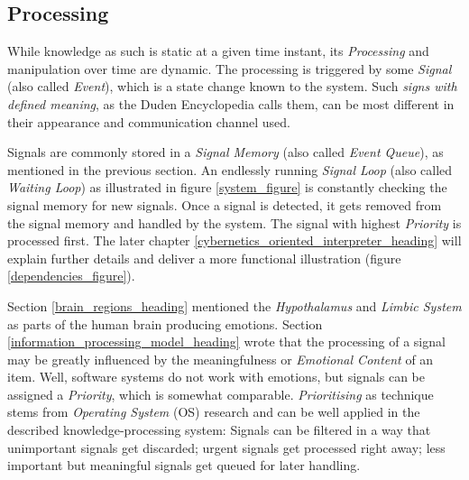 %
%
%
%
%
%
%

\subsection{Processing}
\label{processing_heading}

While knowledge as such is static at a given time instant, its \emph{Processing}
and manipulation over time are dynamic. The processing is triggered by some
\emph{Signal} (also called \emph{Event}), which is a state change known to the
system. Such \textit{signs with defined meaning}, as the Duden Encyclopedia
\cite{duden} calls them, can be most different in their appearance and
communication channel used.

Signals are commonly stored in a \emph{Signal Memory} (also called
\emph{Event Queue}), as mentioned in the previous section. An endlessly running
\emph{Signal Loop} (also called \emph{Waiting Loop}) as illustrated in figure
\ref{system_figure} is constantly checking the signal memory for new signals.
Once a signal is detected, it gets removed from the signal memory and handled
by the system. The signal with highest \emph{Priority} is processed first. The
later chapter \ref{cybernetics_oriented_interpreter_heading} will explain
further details and deliver a more functional illustration (figure
\ref{dependencies_figure}).

Section \ref{brain_regions_heading} mentioned the \emph{Hypothalamus} and
\emph{Limbic System} as parts of the human brain producing emotions. Section
\ref{information_processing_model_heading} wrote that the processing of a signal
may be greatly influenced by the meaningfulness or \emph{Emotional Content} of
an item. Well, software systems do not work with emotions, but signals can be
assigned a \emph{Priority}, which is somewhat comparable. \emph{Prioritising}
as technique stems from \emph{Operating System} (OS) research and can be well
applied in the described knowledge-processing system: Signals can be filtered
in a way that unimportant signals get discarded; urgent signals get processed
right away; less important but meaningful signals get queued for later handling.

